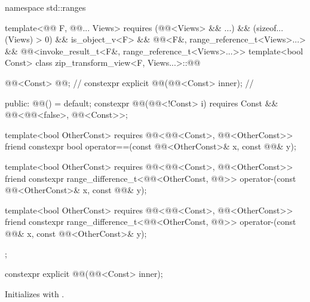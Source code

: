%
\begin{codeblock}
namespace std::ranges {
  template<@@ F, @@... Views>
    requires (@@<Views> && ...) && (sizeof...(Views) > 0) && is_object_v<F> &&
              @@<F&, range_reference_t<Views>...> &&
              @@<invoke_result_t<F&, range_reference_t<Views>...>>
  template<bool Const>
  class zip_transform_view<F, Views...>::@@ {
    @@<Const> @@;                                     // \expos
    constexpr explicit @@(@@<Const> inner);         // \expos

  public:
    @@() = default;
    constexpr @@(@@<!Const> i)
      requires Const && @@<@@<false>, @@<Const>>;

    template<bool OtherConst>
      requires @@<@@<Const>, @@<OtherConst>>
    friend constexpr bool operator==(const @@<OtherConst>& x, const @@& y);

    template<bool OtherConst>
      requires @@<@@<Const>, @@<OtherConst>>
    friend constexpr range_difference_t<@@<OtherConst, @@>>
      operator-(const @@<OtherConst>& x, const @@& y);

    template<bool OtherConst>
      requires @@<@@<Const>, @@<OtherConst>>
    friend constexpr range_difference_t<@@<OtherConst, @@>>
      operator-(const @@& x, const @@<OtherConst>& y);
  };
}
\end{codeblock}

%
\begin{itemdecl}
constexpr explicit @@(@@<Const> inner);
\end{itemdecl}

\begin{itemdescr}
\pnum
\effects
Initializes  with .
\end{itemdescr}

